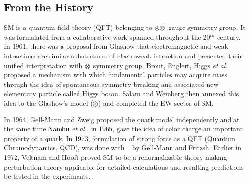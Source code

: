 \subsection{From the History}
\par SM is a quantum field theory (QFT) belonging to \suthreec$\otimes$\sutwol$\otimes$\uoneg~gauge symmetry group. It was formulated from a collaborative work spanned throughout the 20$^{th}$ century. In 1961, there was a proposal from Glashow that electromagnetic and weak intractions are similar substrctures of electroweak intraction and presented their unified interpretation with \sutwol$\otimes$\uoneg ~symmetry group.  Brout, Englert, Higgs \textit{et al.} proposed a mechanism with which fundamental particles may acquire mass through the idea of spontaneous symmetry breaking and associated new elementary particle called Higgs boson. Salam and Weinberg then annexed this idea to the Glashow's model (\sutwol$\otimes$\uoneg ) and completed the EW sector of SM. %
\par In 1964, Gell-Mann and Zweig proposed the quark model independently and at the same time Nambu \textit{et al.}, in 1965, gave the idea of color charge an important property of a quark. In 1973, formulation of strong force as a QFT (Quantum Chromodynamics, QCD),  was done with \suthreec~ by Gell-Mann and Fritzsh. Earlier in 1972, Veltnam and Hooft proved SM to be a renormalizable theory making perturbation theory applicable for detailed calculations and resulting predictions be tested in the experiments.

